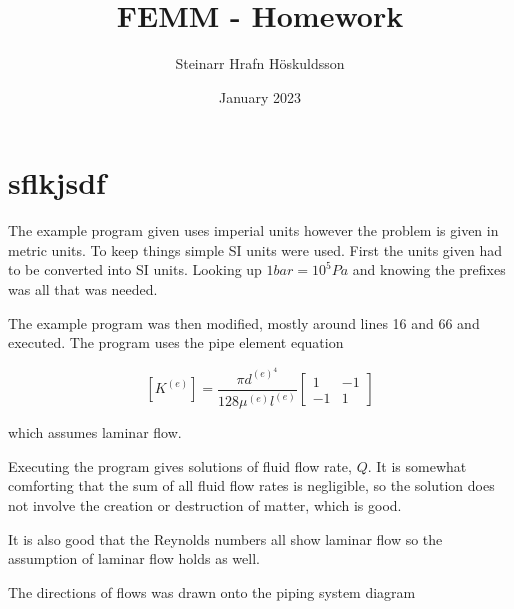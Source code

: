 \documentclass{article}
\title{FEMM - Homework}
\author{Steinarr Hrafn Höskuldsson}
\date{January 2023}
\begin{document}
\maketitle

\section{sflkjsdf}
The example program given uses imperial units however the problem is given in metric units.  To keep things simple SI units were used. First the units given had to be converted into SI units. Looking up $1 bar = 10^5 Pa$ and knowing the prefixes was all that was needed.

The example program was then modified, mostly around lines 16 and 66 and executed. The program uses the pipe element equation 

$$\left[K^{(e)}\right]=\frac{\pi d^{(e)^4}}{128 \mu^{(e)} l^{(e)}}\left[\begin{array}{rr}
1 & -1 \\
-1 & 1 
\end{array}\right] $$

which assumes laminar flow.

Executing the program gives solutions of fluid flow rate, $Q$. It is somewhat comforting that the sum of all fluid flow rates is negligible, so the solution does not involve the creation or destruction of matter, which is good.

It is also good that the Reynolds numbers all show laminar flow so the assumption of laminar flow holds as well.

The directions of flows was drawn onto the piping system diagram 
\end{document}
